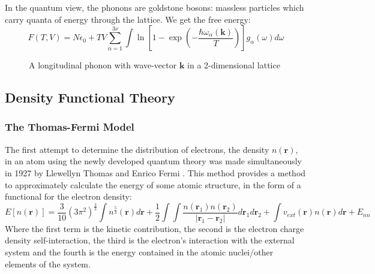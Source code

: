 \documentclass[12pt]{article}
\begin{document}
In the quantum view, the phonons are goldstone bosons: massless particles which carry quanta of energy through the lattice. We get the free energy:
\begin{equation}
	F(T, V) = N\epsilon_0 + TV\sum_{\alpha=1}^{3\nu}\int \ln \left[ 1-\exp\left(-\frac{\hbar \omega_\alpha(\mathbf k)}{T}\right)\right]g_\alpha(\omega)d\omega
\end{equation}

\begin{figure}
\centering
{}
\caption{A longitudinal phonon with wave-vector $\mathbf k$ in a 2-dimensional lattice}
\label{fig:phonon:disturbance}
\end{figure}

\subsection{Density Functional Theory}
\subsubsection{The Thomas-Fermi Model}
The first attempt to determine the distribution of electrons, the density $n(\mathbf r)$, in an atom using the newly developed quantum theory was made simultaneously in 1927 by Llewellyn Thomas \cite{thomas_1927} and Enrico Fermi \cite{fermi1927metodo}. This method provides a method to approximately calculate the energy of some atomic structure, in the form of a functional for the electron density:
\begin{equation}\label{eq:thomas-fermi}
	E[n(\mathbf r)] = \frac{3}{10}(3\pi^2)^{\frac{2}{3}}\int n^{\frac{5}{3}}(\mathbf r) d \mathbf r + \frac{1}{2}\int\int\frac{n(\mathbf r_1) n(\mathbf r_2)}{\left| \mathbf r_1 - \mathbf r_2\right|}d\mathbf r_1 d\mathbf r_2 + \int v_{ext}(\mathbf r) n(\mathbf r) d \mathbf r + E_{nn}
\end{equation}
Where the first term is the kinetic contribution, the second is the electron charge density self-interaction, the third is the electron's interaction with the external system and the fourth is the energy contained in the atomic nuclei/other elements of the system.
\end{document}
